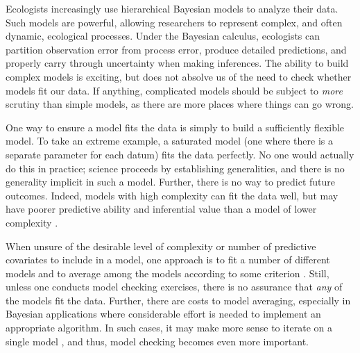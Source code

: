 \documentclass[12pt,english]{article}
\begin{document}
\begin{spacing}{1.9}
Ecologists increasingly use hierarchical Bayesian models to analyze their data.  Such models are powerful, allowing researchers to represent complex, and often dynamic, ecological processes.  Under the Bayesian calculus, ecologists can partition observation error from process error, produce detailed predictions, and properly carry through uncertainty when making inferences.
The ability to build complex models is exciting, but does not absolve us of the need to check whether models fit our data.  If anything, complicated models should be subject to \textit{more} scrutiny than simple models, as there are more places where things can go wrong.  


One way to ensure a model fits the data is simply to build a sufficiently flexible model.  To take an extreme example, a saturated model (one where there is a separate parameter for
each datum) fits the data perfectly.  No one would
actually do this in practice; science proceeds by establishing
generalities, and there is no generality implicit in such a model.
Further, there is no way to predict future outcomes.
Indeed, models with high complexity can fit the data well, but may
have poorer predictive ability and inferential value than a model of lower complexity
\citep{BurnhamAnderson2002,HootenHobbs2015}.

When unsure of the desirable level of complexity or number of
predictive covariates to include in a model, one approach is to fit a
number of different models and to average among the models according
to some criterion \citep[see,
e.g.,][]{Green1995,HoetingEtAl1999,LinkBarker2006}. Still, unless one
conducts model checking exercises, there is no assurance that
\textit{any} of the models fit the data.  Further, there are costs to
model averaging, especially in Bayesian applications where
considerable effort is needed to implement an appropriate algorithm.
In such cases, it may make more sense to iterate on a single model
\citep{VerHoefBoveng2015}, and thus, model checking becomes even more
important.


\end{spacing}
\end{document}
